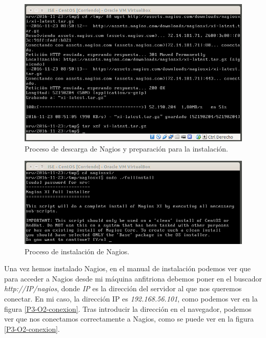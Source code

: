\documentclass[a4paper,titlepage,12pt]{report}	%
\numberwithin{figure}{section} %
\numberwithin{table}{section} %
\begin{document}
	\begin{figure}[H]
	   \includegraphics[width=\linewidth]{./Imagenes/P3/O2-1.png}
	   \vspace{-0.5cm}
	   \caption[Proceso de descarga de Nagios y preparación para la instalación.]{Proceso de descarga de Nagios y preparación para la instalación.}
	   \label{P3-O2-1}
	\end{figure}

	\begin{figure}[H]
	   \includegraphics[width=\linewidth]{./Imagenes/P3/O2-2.png}
	   \vspace{-0.5cm}
	   \caption[Proceso de instalación de Nagios.]{Proceso de instalación de Nagios.}
	   \label{P3-O2-2}
	\end{figure}

	Una vez hemos instalado Nagios, en el manual de instalación \cite{nagios} podemos ver que para acceder a Nagios desde mi máquina anfitriona debemos poner en el buscador \textit{http://IP/nagios}, donde \textit{IP} es la dirección del servidor al que nos queremos conectar. En mi caso, la dirección IP es \textit{192.168.56.101}, como podemos ver en la figura \ref{P3-O2-conexion}. Tras introducir la dirección en el navegador, podemos ver que nos conectamos correctamente a Nagios, como se puede ver en la figura \ref{P3-O2-conexion}.
\end{document}
